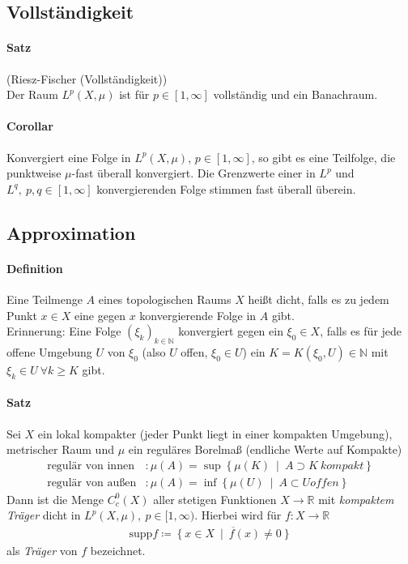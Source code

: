 \documentclass[12pt,a4paper,fleqn]{article}
\def\set#1{{\left\{ #1 \right\}}}
\def\Mid{\ \middle|\ }
\begin{document}
\subsection{Vollständigkeit}

\paragraph{Satz} (Riesz-Fischer (Vollständigkeit))\\
Der Raum ${L}^p(X, \mu)$ ist für $p \in [1, \infty]$ vollständig und ein Banachraum.

\paragraph{Corollar} Konvergiert eine Folge in ${L}^p(X, \mu)$, $p \in [1, \infty]$, so gibt es eine Teilfolge, die punktweise $\mu$-fast überall konvergiert. Die Grenzwerte einer in ${L}^p$ und \mbox{${L}^q,\ p, q \in [1, \infty]$} konvergierenden Folge stimmen fast überall überein.

\subsection{Approximation}

\paragraph{Definition} Eine Teilmenge $A$ eines topologischen Raums $X$ heißt dicht, falls es zu jedem Punkt $x \in X$ eine gegen $x$ konvergierende Folge in $A$ gibt.\\
Erinnerung: Eine Folge $(\xi_k)_{k \in \mathbb{N}}$ konvergiert gegen ein $\xi_0 \in X$, falls es für jede offene Umgebung $U$ von $\xi_0$ (also $U$ offen, $\xi_0 \in U$) ein $K = K(\xi_0, U) \in \mathbb{N}$ mit $\xi_k \in U\ \forall k \geq K$ gibt.

\paragraph{Satz} Sei $X$ ein lokal kompakter (jeder Punkt liegt in einer kompakten Umgebung), metrischer Raum und $\mu$ ein reguläres Borelmaß (endliche Werte auf Kompakte)
\begin{align*}
\text{regulär von innen}&\colon \mu(A) = \sup \set{\mu(K) \Mid A \supset K\ kompakt}\\
\text{regulär von außen}&\colon \mu(A) = \inf \set{\mu(U) \Mid A \subset U \mathit{offen}}
\end{align*}
Dann ist die Menge $C^0_c(X)$ aller stetigen Funktionen $X \rightarrow \mathbb{R}$ mit \textit{kompaktem Träger} dicht in $L^p(X, \mu),\ p \in [1, \infty)$. Hierbei wird für $f\colon X \rightarrow\mathbb{R}$
\begin{align*}
\text{supp} f \coloneqq \overline{\set{x \in X \Mid f(x) \not = 0}}
\end{align*}
als \textit{Träger} von $f$ bezeichnet.
\end{document}
